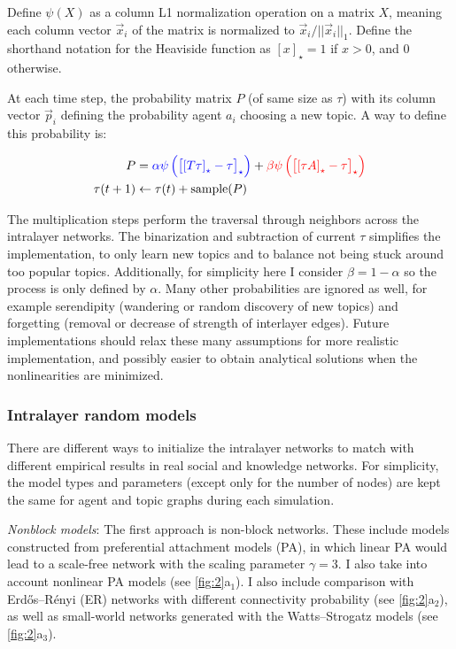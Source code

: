 Define $\psi(X)$ as a column L1 normalization operation on a matrix $X$, meaning each column vector $\vec{x}_i$ of the matrix is normalized to $\vec{x}_i/||\vec{x}_i||_1$. Define the shorthand notation for the Heaviside function as $[x]_{\star} = 1$ if $x > 0$, and $0$ otherwise.

At each time step, the probability matrix $P$ (of same size as $\tau$) with its column vector $\vec{p}_i$ defining the probability agent $a_i$ choosing a new topic. A way to define this probability is:

\vspace{-1em}
\begin{align}
    P &=
    {\color{blue}
    \alpha \psi\left(\left[\left[T\tau\right]_{\star} - \tau \right]_{\star}\right)} +
    {\color{red}
    \beta \psi\left(\left[\left[\tau A\right]_{\star} - \tau \right]_{\star}\right)}
    \\
    \tau(t+1) &\leftarrow \tau(t) + \mathrm{sample}(P)
\end{align}

The multiplication steps perform the traversal through neighbors across the intralayer networks. The binarization and subtraction of current $\tau$ simplifies the implementation, to only learn new topics and to balance not being stuck around too popular topics. Additionally, for simplicity here I consider $\beta = 1 - \alpha$ so the process is only defined by $\alpha$. Many other probabilities are ignored as well, for example serendipity (wandering or random discovery of new topics) and forgetting (removal or decrease of strength of interlayer edges). Future implementations should relax these many assumptions for more realistic implementation, and possibly easier to obtain analytical solutions when the nonlinearities are minimized.



\subsubsection*{Intralayer random models}

There are different ways to initialize the intralayer networks to match with different empirical results in real social and knowledge networks. For simplicity, the model types and parameters (except only for the number of nodes) are kept the same for agent and topic graphs during each simulation.

\textit{Nonblock models}: The first approach is non-block networks. These include models constructed from preferential attachment models (PA), in which linear PA would lead to a scale-free network with the scaling parameter $\gamma = 3$. I also take into account nonlinear PA models (see \autoref{fig:2}a$_1$). I also include comparison with Erdős–Rényi (ER) networks with different connectivity probability (see \autoref{fig:2}a$_2$), as well as small-world networks generated with the Watts–Strogatz models (see \autoref{fig:2}a$_3$).

